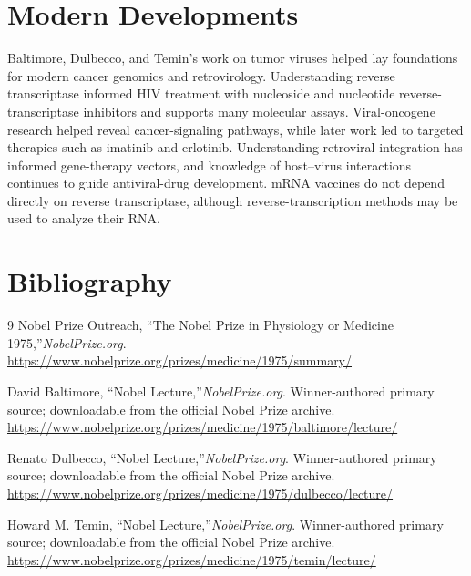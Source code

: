 \section{Modern Developments}

Baltimore, Dulbecco, and Temin's work on tumor viruses helped lay foundations for modern cancer genomics and retrovirology. Understanding reverse transcriptase informed HIV treatment with nucleoside and nucleotide reverse-transcriptase inhibitors and supports many molecular assays. Viral-oncogene research helped reveal cancer-signaling pathways, while later work led to targeted therapies such as imatinib and erlotinib. Understanding retroviral integration has informed gene-therapy vectors, and knowledge of host--virus interactions continues to guide antiviral-drug development. mRNA vaccines do not depend directly on reverse transcriptase, although reverse-transcription methods may be used to analyze their RNA.


\section{Bibliography}

\begin{thebibliography}{9}
Nobel Prize Outreach, ``The Nobel Prize in Physiology or Medicine 1975,''\emph{NobelPrize.org}.\\
\url{https://www.nobelprize.org/prizes/medicine/1975/summary/}

David Baltimore, ``Nobel Lecture,''\emph{NobelPrize.org}. Winner-authored primary source; downloadable from the official Nobel Prize archive.\\
\url{https://www.nobelprize.org/prizes/medicine/1975/baltimore/lecture/}

Renato Dulbecco, ``Nobel Lecture,''\emph{NobelPrize.org}. Winner-authored primary source; downloadable from the official Nobel Prize archive.\\
\url{https://www.nobelprize.org/prizes/medicine/1975/dulbecco/lecture/}

Howard M. Temin, ``Nobel Lecture,''\emph{NobelPrize.org}. Winner-authored primary source; downloadable from the official Nobel Prize archive.\\
\url{https://www.nobelprize.org/prizes/medicine/1975/temin/lecture/}
\end{thebibliography}
